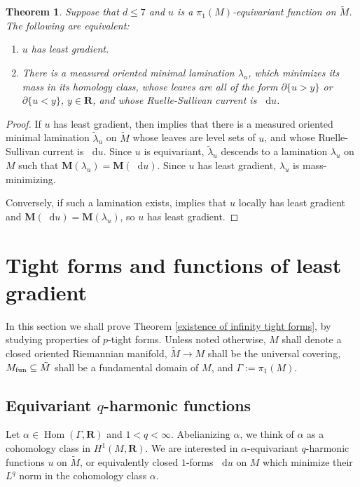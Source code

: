 \documentclass[reqno,11pt]{amsart}
\newcommand{\RR}{\mathbf{R}}
\newcommand*\dif{\mathop{}\!\mathrm{d}}
\DeclareMathOperator{\Hom}{Hom}
\newcommand{\Mass}{\mathbf M}
\newtheorem{theorem}{Theorem}[section]
\theoremstyle{definition}
\numberwithin{equation}{section}
\begin{document}
\begin{theorem}\label{1 harmonic is MOML}
Suppose that $d \leq 7$ and $u$ is a $\pi_1(M)$-equivariant function on $\tilde M$.
The following are equivalent:
\begin{enumerate}
\item $u$ has least gradient.
\item There is a measured oriented minimal lamination $\lambda_u$, which minimizes its mass in its homology class, whose leaves are all of the form $\partial \{u > y\}$ or $\partial \{u < y\}$, $y \in \RR$, and whose Ruelle-Sullivan current is $\dif u$.
\end{enumerate}
\end{theorem}
\begin{proof}
If $u$ has least gradient, then \cite[Theorem B]{BackusCML} implies that there is a measured oriented minimal lamination $\tilde \lambda_u$ on $\tilde M$ whose leaves are level sets of $u$, and whose Ruelle-Sullivan current is $\dif u$.
Since $u$ is equivariant, $\tilde \lambda_u$ descends to a lamination $\lambda_u$ on $M$ such that $\Mass(\lambda_u) = \Mass(\dif u)$.
Since $u$ has least gradient, $\lambda_u$ is mass-minimizing.

Conversely, if such a lamination exists, \cite[Theorem B]{BackusCML} implies that $u$ locally has least gradient and $\Mass(\dif u) = \Mass(\lambda_u)$, so $u$ has least gradient.
\end{proof}






\section{Tight forms and functions of least gradient}\label{tight forms sec}
In this section we shall prove Theorem \ref{existence of infinity tight forms}, by studying properties of $p$-tight forms.
Unless noted otherwise, $M$ shall denote a closed oriented Riemannian manifold, $\tilde M \to M$ shall be the universal covering, $M_{\rm fun} \subseteq \tilde M$ shall be a fundamental domain of $M$, and $\Gamma := \pi_1(M)$.


\subsection{Equivariant \texorpdfstring{$q$-harmonic}{q-harmonic} functions}
Let $\alpha \in \Hom(\Gamma, \RR)$ and $1 < q < \infty$.
Abelianizing $\alpha$, we think of $\alpha$ as a cohomology class in $H^1(M, \RR)$.
We are interested in $\alpha$-equivariant $q$-harmonic functions $u$ on $\tilde M$, or equivalently closed $1$-forms $\dif u$ on $M$ which minimize their $L^q$ norm in the cohomology class $\alpha$.
\end{document}
